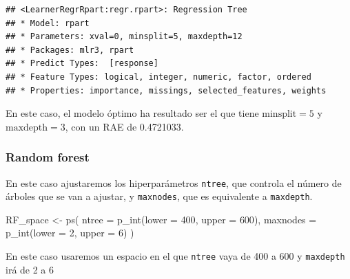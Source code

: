 \documentclass[
  11pt,
  a4paper,
]{article}
\newenvironment{Shaded}{\begin{snugshade}}{\end{snugshade}}
\newcommand{\AttributeTok}[1]{\textcolor[rgb]{0.77,0.63,0.00}{#1}}
\newcommand{\CommentTok}[1]{\textcolor[rgb]{0.56,0.35,0.01}{\textit{#1}}}
\newcommand{\ConstantTok}[1]{\textcolor[rgb]{0.00,0.00,0.00}{#1}}
\newcommand{\DecValTok}[1]{\textcolor[rgb]{0.00,0.00,0.81}{#1}}
\newcommand{\FunctionTok}[1]{\textcolor[rgb]{0.00,0.00,0.00}{#1}}
\newcommand{\NormalTok}[1]{#1}
\newcommand{\OtherTok}[1]{\textcolor[rgb]{0.56,0.35,0.01}{#1}}
\newcommand{\SpecialCharTok}[1]{\textcolor[rgb]{0.00,0.00,0.00}{#1}}
\newcommand{\StringTok}[1]{\textcolor[rgb]{0.31,0.60,0.02}{#1}}
\begin{document}
\begin{verbatim}
## <LearnerRegrRpart:regr.rpart>: Regression Tree
## * Model: rpart
## * Parameters: xval=0, minsplit=5, maxdepth=12
## * Packages: mlr3, rpart
## * Predict Types:  [response]
## * Feature Types: logical, integer, numeric, factor, ordered
## * Properties: importance, missings, selected_features, weights
\end{verbatim}

En este caso, el modelo óptimo ha resultado ser el que tiene
\(\text{minsplit}=5\) y \(\text{maxdepth}=3\), con un RAE de 0.4721033.

\subsubsection{Random forest}

En este caso ajustaremos los hiperparámetros \texttt{ntree}, que
controla el número de árboles que se van a ajustar, y \texttt{maxnodes},
que es equivalente a \texttt{maxdepth}.

\begin{Shaded}
\begin{Highlighting}[]
\NormalTok{RF\_space }\OtherTok{\textless{}{-}} \FunctionTok{ps}\NormalTok{(}
  \AttributeTok{ntree =} \FunctionTok{p\_int}\NormalTok{(}\AttributeTok{lower =} \DecValTok{400}\NormalTok{, }\AttributeTok{upper =} \DecValTok{600}\NormalTok{),}
  \AttributeTok{maxnodes =} \FunctionTok{p\_int}\NormalTok{(}\AttributeTok{lower =} \DecValTok{2}\NormalTok{, }\AttributeTok{upper =} \DecValTok{6}\NormalTok{)}
\NormalTok{)}
\end{Highlighting}
\end{Shaded}

En este caso usaremos un espacio en el que \texttt{ntree} vaya de 400 a
600 y \texttt{maxdepth} irá de 2 a 6

\begin{Shaded}
\end{Shaded}
\end{document}
